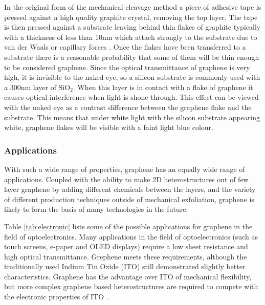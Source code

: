 \documentclass[12pt,titlepage]{article}
\begin{document}
	In the original form of the mechanical cleavage method a piece of adhesive tape is pressed against a high quality graphite crystal, removing the top layer. The tape is then pressed against a substrate leaving behind thin flakes of graphite typically with a thickness of less than 10nm which attach strongly to the substrate due to van der Waals or capillary forces \cite{Novoselov2004}. Once the flakes have been transferred to a substrate there is a reasonable probability that some of them will be thin enough to be considered graphene. Since the optical transmittance of graphene is very high, it is invisible to the naked eye, so a silicon substrate is commonly used with a 300nm layer of $\text{SiO}_2$. When this layer is in contact with a flake of graphene it causes optical interference when light is shone through. This effect can be viewed with the naked eye as a contrast difference between the graphene flake and the substrate. This means that under white light with the silicon substrate appearing white, graphene flakes will be visible with a faint light blue colour.
	
	\subsubsection{Applications}
	
	With such a wide range of properties, graphene has an equally wide range of applications. Coupled with the ability to make 2D heterostructures out of few layer graphene by adding different chemicals between the layers, and the variety of different production techniques outside of mechanical exfoliation, graphene is likely to form the basis of many technologies in the future.
	
	Table \ref{tab:electronic} lists some of the possible applications for graphene in the field of optoelectronics. Many applications in the field of optoelectronics (such as touch screens, e-paper and OLED displays) require a low sheet resistance and high optical transmittance. Grephene meets these requirements, although the traditionally used Indium Tin Oxide (ITO) still demonstrated slightly better characteristics. Graphene has the advantage over ITO of mechanical flexibility, but more complex graphene based heterostructures are required to compete with the electronic properties of ITO \cite{Novoselov2012}.
	
\end{document}
